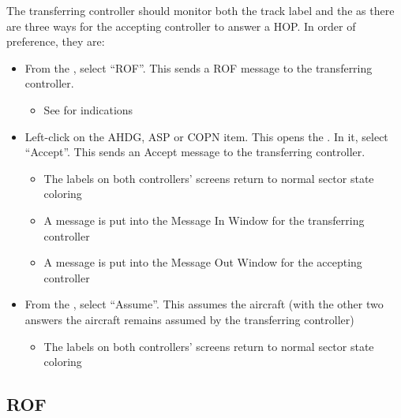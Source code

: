 \documentclass[a4paper,oneside,11pt]{memoir}
\begin{document}
The transferring controller should monitor both the track label and the  as there are three ways for the accepting controller to answer a HOP. In order of preference, they are:

\begin{itemize}
  \item From the , select “ROF”. This sends a ROF message to the transferring controller.
  \begin{itemize}
    \item See  for indications
  \end{itemize}
  \item Left-click on the AHDG, ASP or COPN item. This opens the . In it, select “Accept”. This sends an Accept message to the transferring controller.
  \begin{itemize}
    \item The labels on both controllers’ screens return to normal sector state coloring
    \item A message is put into the Message In Window for the transferring controller
    \item A message is put into the Message Out Window for the accepting controller
  \end{itemize}
  \item From the , select “Assume”. This assumes the aircraft (with the other two answers the aircraft remains assumed by the transferring controller)
  \begin{itemize}
    \item The labels on both controllers’ screens return to normal sector state coloring
  \end{itemize}
\end{itemize}


\subsection{ROF}
\label{coo:rof}
\end{document}
